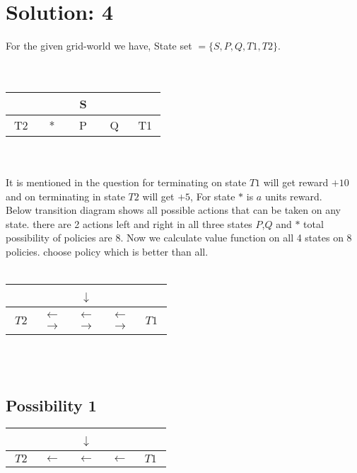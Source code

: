 \documentclass{article}
\begin{document}
\section{Solution: 4}
For the given grid-world we have, State set $=\{S,P,Q,T1,T2\}$.\\
\\
\\
\begin{tabular}{|c|c|c|c|c|}
\hline 
~~~ & ~~~ & ~S~ & ~~~ & ~~~\tabularnewline
\hline 
\hline 
T2 & {*} & P & Q & T1\tabularnewline
\hline 
\end{tabular}\\
\\
It is mentioned in the question for terminating on state $T1$ will get reward $+10$ and on terminating in state $T2$ will get $+5$, For state $*$ is $a$ units reward.\\
Below transition diagram shows all possible actions that can be taken on any state. there are 2 actions left and right in all three states $P$,$Q$ and $*$ total possibility of policies are 8. Now we calculate value function on all 4 states on 8 policies. choose policy which is better than all.\\
\\
\begin{tabular}{|c|c|c|c|c|}
\hline 
~~~ & ~~~ & ~$\downarrow$~ & ~~~ & ~~~\tabularnewline
\hline 
\hline 
$T2$ & $\begin{array}{c}
\leftarrow\\
\rightarrow
\end{array}$ & $\begin{array}{c}
\leftarrow\\
\rightarrow
\end{array}$ & $\begin{array}{c}
\leftarrow\\
\rightarrow
\end{array}$ & $T1$\tabularnewline
\hline 
\end{tabular}\\
\\

\subsection{Possibility 1}

\begin{tabular}{|c|c|c|c|c|}
\hline 
~~~ & ~~~ & ~$\downarrow$~ & ~~~ & ~~~\tabularnewline
\hline 
\hline 
$T2$ & $\begin{array}{c}
\leftarrow\end{array}$ & $\leftarrow$ & $\leftarrow$ & $T1$\tabularnewline
\hline 
\end{tabular}\\
\\
\end{document}
